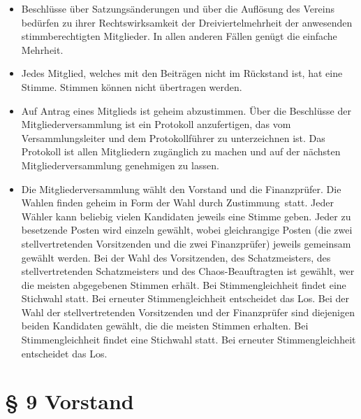 \documentclass[12pt,paper=a4,ngerman]{scrreprt}
\begin{document}
\begin{itemize}
\item[(4)]
Beschlüsse über Satzungsänderungen und über die Auflösung des Vereins
bedürfen zu ihrer Rechtswirksamkeit der Dreiviertelmehrheit der
anwesenden stimmberechtigten Mitglieder. In allen anderen Fällen
genügt die einfache Mehrheit.
\item[(5)]
Jedes Mitglied, welches mit den Beiträgen nicht im Rückstand ist, hat
eine Stimme. Stimmen können nicht übertragen werden.
\item[(6)]
Auf Antrag eines Mitglieds ist geheim abzustimmen. Über die Beschlüsse
der Mitgliederversammlung ist ein Protokoll anzufertigen, das vom
Versammlungsleiter und dem Protokollführer zu unterzeichnen ist. Das
Protokoll ist allen Mitgliedern zugänglich zu machen und auf der
nächsten Mitgliederversammlung genehmigen zu lassen.
\item[(7)]
Die Mitgliederversammlung wählt den Vorstand und die Finanzprüfer. Die
Wahlen finden geheim in Form der \glqq Wahl durch Zustimmung\grqq\
statt. Jeder Wähler kann beliebig vielen Kandidaten jeweils eine
Stimme geben. Jeder zu besetzende Posten wird einzeln gewählt, wobei
gleichrangige Posten (die zwei stellvertretenden Vorsitzenden und die
zwei Finanzprüfer) jeweils gemeinsam gewählt werden. Bei der Wahl des
Vorsitzenden, des Schatzmeisters, des stellvertretenden Schatzmeisters und des Chaos-Beauftragten ist
gewählt, wer die meisten abgegebenen Stimmen erhält. Bei
Stimmengleichheit findet eine Stichwahl statt. Bei erneuter
Stimmengleichheit entscheidet das Los. Bei der Wahl der
stellvertretenden Vorsitzenden und der Finanzprüfer sind diejenigen
beiden Kandidaten gewählt, die die meisten Stimmen erhalten. Bei
Stimmengleichheit findet eine Stichwahl statt. Bei erneuter
Stimmengleichheit entscheidet das Los.
\end{itemize}

\section{\S{} 9 Vorstand}
\end{document}
